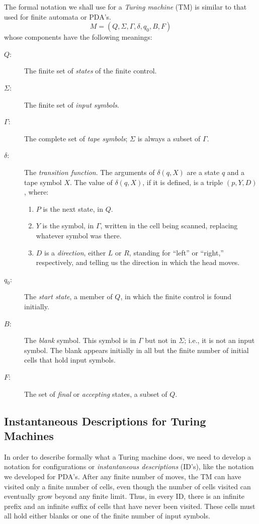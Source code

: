 \documentclass[]{article}
\begin{document}
    The formal notation we shall use for a \emph{Turing machine} (TM) is 
    similar to that used for finite automata or PDA's.
      \[ M = (Q,\Sigma,\Gamma,\delta,q_0,B,F) \]
    whose components have the following meanings:
      \begin{description}
        \item[$Q$:] The finite set of \emph{states} of the finite control.
        \item[$\Sigma$:] The finite set of \emph{input symbols}.
        \item[$\Gamma$:] The complete set of \emph{tape symbols}; $\Sigma$ is 
        always a subset of $\Gamma$.
        \item[$\delta$:] The \emph{transition function}. The arguments of 
        $\delta(q,X)$ are a state $q$ and a tape symbol $X$. The value of
        $\delta(q,X)$, if it is defined, is a triple $(p,Y,D)$, where:
          \begin{enumerate}
            \item $P$ is the next state, in $Q$.
            \item $Y$ is the symbol, in $\Gamma$, written in the cell being 
            scanned, replacing whatever symbol was there.
            \item $D$ is a \emph{direction}, either $L$ or $R$, standing for 
            ``left'' or ``right,'' respectively, and telling us the direction 
            in which the head moves.
          \end{enumerate}
        \item[$q_0$:] The \emph{start state}, a member of $Q$, in which the 
        finite control is found initially.
        \item[$B$:] The \emph{blank} symbol. This symbol is in $\Gamma$ but not 
        in $\Sigma$; i.e., it is not an input symbol. The blank appears 
        initially in all but the finite number of initial cells that hold input 
        symbols.
        \item[$F$:] The set of \emph{final} or \emph{accepting} states, a 
        subset of $Q$.
      \end{description}
      
  \subsection*{Instantaneous Descriptions for Turing Machines}
    In order to describe formally what a Turing machine does, we need to 
    develop a notation for configurations or \emph{instantaneous descriptions} 
    (ID's), like the notation we developed for PDA's. After any finite number 
    of moves, the TM can have visited only a finite number of cells, even 
    though the number of cells visited can eventually grow beyond any finite 
    limit. Thus, in every ID, there is an infinite prefix and an infinite 
    suffix of cells that have never been visited. These cells must all hold 
    either blanks or one of the finite number of input symbols.
    
\end{document}
